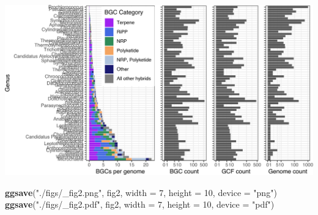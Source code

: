 \documentclass[
]{article}
\newenvironment{Shaded}{\begin{snugshade}}{\end{snugshade}}
\newcommand{\AttributeTok}[1]{\textcolor[rgb]{0.13,0.29,0.53}{#1}}
\newcommand{\DecValTok}[1]{\textcolor[rgb]{0.00,0.00,0.81}{#1}}
\newcommand{\FunctionTok}[1]{\textcolor[rgb]{0.13,0.29,0.53}{\textbf{#1}}}
\newcommand{\NormalTok}[1]{#1}
\newcommand{\StringTok}[1]{\textcolor[rgb]{0.31,0.60,0.02}{#1}}
\begin{document}
\includegraphics{analysis_files/figure-latex/unnamed-chunk-16-1.pdf}

\begin{Shaded}
\begin{Highlighting}[]
\FunctionTok{ggsave}\NormalTok{(}\StringTok{"./figs/\_fig2.png"}\NormalTok{, fig2, }\AttributeTok{width =} \DecValTok{7}\NormalTok{, }\AttributeTok{height =} \DecValTok{10}\NormalTok{, }\AttributeTok{device =} \StringTok{"png"}\NormalTok{)}
\FunctionTok{ggsave}\NormalTok{(}\StringTok{"./figs/\_fig2.pdf"}\NormalTok{, fig2, }\AttributeTok{width =} \DecValTok{7}\NormalTok{, }\AttributeTok{height =} \DecValTok{10}\NormalTok{, }\AttributeTok{device =} \StringTok{"pdf"}\NormalTok{)}
\end{Highlighting}
\end{Shaded}
\end{document}
